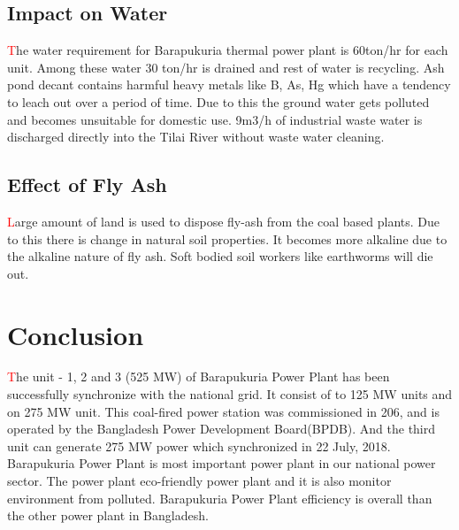 \documentclass[11 pt]{article}
\begin{document}
\subsection{Impact on Water}
\hspace{5 mm} {\huge\textcolor{red}{T}}he water requirement for Barapukuria thermal power plant is 60ton/hr for each unit. Among these water 30 ton/hr is drained and rest of water is recycling. Ash pond decant contains harmful heavy metals like B, As, Hg which have a tendency to leach out over a period of time. Due to this the ground water gets polluted and becomes unsuitable for domestic use. 9m3/h of industrial waste water is discharged directly into the Tilai River without waste water cleaning.
\subsection{Effect of Fly Ash}
\hspace{5 mm} {\huge\textcolor{red}{L}}arge amount of land is used to dispose fly-ash from the coal based plants. Due to this there is change in natural soil properties. It becomes more alkaline due to the alkaline nature of fly ash. Soft bodied soil workers like earthworms will die out.

\section{Conclusion}
\hspace{5 mm} {\huge\textcolor{red}{T}}he unit - 1, 2 and 3 (525 MW) of Barapukuria Power Plant has been successfully synchronize with the national grid. It consist of to 125 MW units and on 275 MW unit. This coal-fired power station was commissioned in 206, and is operated by the Bangladesh Power Development Board(BPDB). And the third unit can generate 275 MW power which synchronized in 22 July, 2018.\\
Barapukuria Power Plant is most important power plant in our national power sector. The power plant eco-friendly power plant and it is also monitor environment from polluted. Barapukuria Power Plant efficiency is overall than the other power plant in Bangladesh.

\pagebreak
\end{document}
